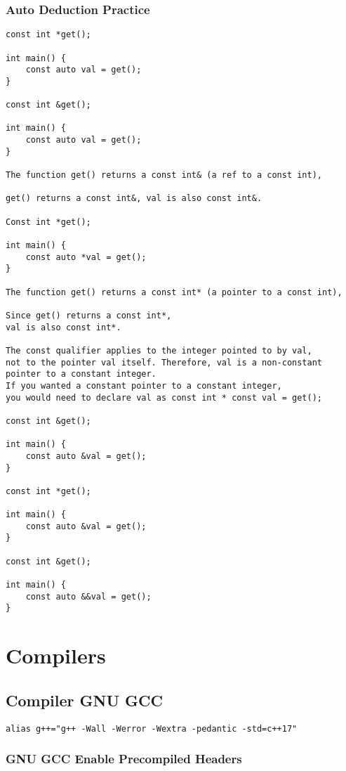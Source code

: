 \subsection{Auto Deduction Practice}

\begin{verbatim}
const int *get();

int main() {
    const auto val = get();
}

const int &get();

int main() {
    const auto val = get();
}

The function get() returns a const int& (a ref to a const int),

get() returns a const int&, val is also const int&.

Const int *get();

int main() {
    const auto *val = get();
}

The function get() returns a const int* (a pointer to a const int),

Since get() returns a const int*,
val is also const int*.

The const qualifier applies to the integer pointed to by val,
not to the pointer val itself. Therefore, val is a non-constant pointer to a constant integer.
If you wanted a constant pointer to a constant integer,
you would need to declare val as const int * const val = get();

const int &get();

int main() {
    const auto &val = get();
}

const int *get();

int main() {
    const auto &val = get();
}

const int &get();

int main() {
    const auto &&val = get();
}
\end{verbatim}

\chapter{Compilers}

\section{Compiler GNU GCC}

\begin{verbatim}
alias g++="g++ -Wall -Werror -Wextra -pedantic -std=c++17"
\end{verbatim}

\subsection{GNU GCC Enable Precompiled Headers}

